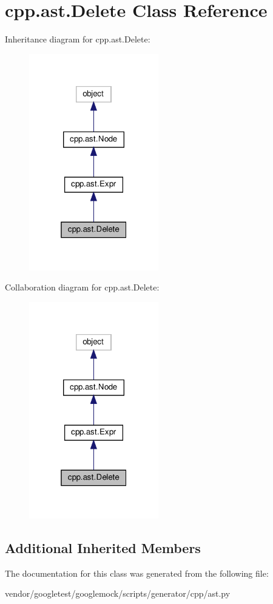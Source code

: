 \hypertarget{classcpp_1_1ast_1_1_delete}{}\section{cpp.\+ast.\+Delete Class Reference}
\label{classcpp_1_1ast_1_1_delete}


Inheritance diagram for cpp.\+ast.\+Delete\+:
\nopagebreak
\begin{figure}[H]
\begin{center}
\leavevmode
\includegraphics[width=160pt]{classcpp_1_1ast_1_1_delete__inherit__graph}
\end{center}
\end{figure}


Collaboration diagram for cpp.\+ast.\+Delete\+:
\nopagebreak
\begin{figure}[H]
\begin{center}
\leavevmode
\includegraphics[width=160pt]{classcpp_1_1ast_1_1_delete__coll__graph}
\end{center}
\end{figure}
\subsection*{Additional Inherited Members}


The documentation for this class was generated from the following file\+:\begin{DoxyCompactItemize}
\item 
vendor/googletest/googlemock/scripts/generator/cpp/ast.\+py\end{DoxyCompactItemize}
